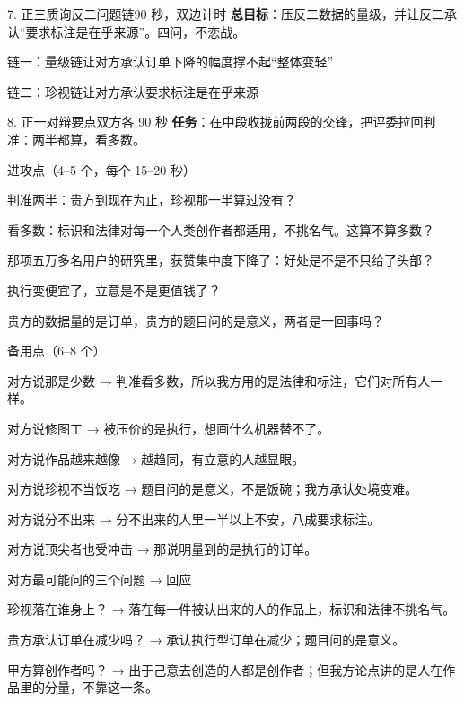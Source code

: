 \documentclass[script,pro]{debate}
\begin{document}
\begin{stage}{7. 正三质询反二问题链}{90 秒，双边计时}
\textbf{总目标}：压反二数据的量级，并让反二承认“要求标注是在乎来源”。四问，不恋战。
\begin{chain}{链一：量级链}{让对方承认订单下降的幅度撑不起“整体变轻”}
\end{chain}
\begin{chain}{链二：珍视链}{让对方承认要求标注是在乎来源}
\end{chain}
\end{stage}

\begin{stage}{8. 正一对辩要点}{双方各 90 秒}
\textbf{任务}：在中段收拢前两段的交锋，把评委拉回判准：两半都算，看多数。
\begin{points}{进攻点（4–5 个，每个 15–20 秒）}
\item 判准两半：贵方到现在为止，珍视那一半算过没有？
\item 看多数：标识和法律对每一个人类创作者都适用，不挑名气。这算不算多数？
\item 那项五万多名用户的研究里，获赞集中度下降了：好处是不是不只给了头部？
\item 执行变便宜了，立意是不是更值钱了？
\item 贵方的数据量的是订单，贵方的题目问的是意义，两者是一回事吗？
\end{points}
\begin{points}{备用点（6–8 个）}
\item 对方说那是少数 → 判准看多数，所以我方用的是法律和标注，它们对所有人一样。
\item 对方说修图工 → 被压价的是执行，想画什么机器替不了。
\item 对方说作品越来越像 → 越趋同，有立意的人越显眼。
\item 对方说珍视不当饭吃 → 题目问的是意义，不是饭碗；我方承认处境变难。
\item 对方说分不出来 → 分不出来的人里一半以上不安，八成要求标注。
\item 对方说顶尖者也受冲击 → 那说明量到的是执行的订单。
\end{points}
\begin{points}{对方最可能问的三个问题 → 回应}
\item 珍视落在谁身上？ → 落在每一件被认出来的人的作品上，标识和法律不挑名气。
\item 贵方承认订单在减少吗？ → 承认执行型订单在减少；题目问的是意义。
\item 甲方算创作者吗？ → 出于己意去创造的人都是创作者；但我方论点讲的是人在作品里的分量，不靠这一条。
\end{points}
\end{stage}
\end{document}
